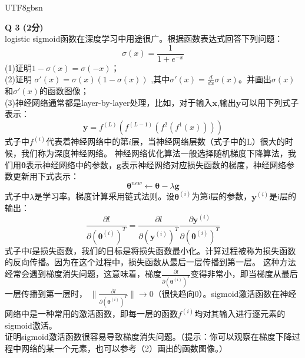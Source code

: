 \documentclass[a4paper, 11pt]{article}
\newenvironment{problem}[2][Q]
    { \begin{mdframed}[backgroundcolor=gray!20] \textbf{#1 #2} \\}
    {  \end{mdframed}}
\begin{document}
\begin{CJK}{UTF8}{gbsn}
\begin{problem}{3 (2分)}
logistic sigmoid函数在深度学习中用途很广。根据函数表达式回答下列问题：
\begin{equation}
    \sigma(x)=\frac{1}{1+e^{-x}}
\end{equation}
(1)证明$1-\sigma(x)=\sigma(-x)$；\\
(2)证明 $\sigma'(x)=\sigma(x)(1-\sigma(x))$ ,其中$\sigma'(x)=\frac{d}{dx}\sigma(x)$。并画出$\sigma(x)$和$\sigma'(x)$的函数图像；\\
(3)神经网络通常都是layer-by-layer处理，比如，对于输入$\bm{x}$,输出$\bm{y}$可以用下列式子表示：
\begin{equation}
    \bm{y}=f^{(L)}(f^{(L-1)}(f^{2}(f^{1}(x))))
\end{equation}
式子中$f^{(i)}$代表着神经网络中的第$i$层，当神经网络层数（式子中的L）很大的时候，我们称为深度神经网络。
神经网络优化算法一般选择随机梯度下降算法，我们用$\bm{\theta}$表示神经网络中的参数，$\bm{g}$表示神经网络对应损失函数的梯度，神经网络参数更新用下式表示：
\begin{equation}
    \bm{\theta}^{new}\leftarrow \bm{\theta}-\lambda \bm{g}
\end{equation}
式子中$\lambda$是学习率。梯度计算采用链式法则。设$\bm{\theta}^{(i)}$为第i层的参数，$\bm{y}^{(i)}$是i层的输出：
\begin{equation}
    \frac{\partial l}{\partial(\bm{\theta}^{(i)})^{T}}
    =\frac{\partial l}{\partial(\bm{y}^{(i)})^{T}} 
    \frac{\partial \bm{y}^{(i)}}{\partial(\bm{\theta}^{(i)})^{T}}
\end{equation}
式子中$l$是损失函数，我们的目标是将损失函数最小化。计算过程被称为损失函数的反向传播。因为在这个过程中，损失函数从最后一层传播到第一层。
这种方法经常会遇到梯度消失问题，这意味着，梯度$ \frac{\partial l}{\partial(\bm{\theta}^{(i)})^{T}}$变得非常小，即当梯度从最后一层传播到第一层时， $\|\frac{\partial l}{\partial(\bm{\theta}^{(i)})^{T}}\|\rightarrow 0$（很快趋向0）。sigmoid激活函数在神经网络中是一种常用的激活函数，即每一层的函数$f^{(i)}$均对其输入进行逐元素的sigmoid激活。 \\
证明sigmoid激活函数很容易导致梯度消失问题。（提示：你可以观察在梯度下降过程中网络的某一个元素，也可以参考（2）画出的函数图像。）
\end{problem}





\end{CJK}
\end{document}
